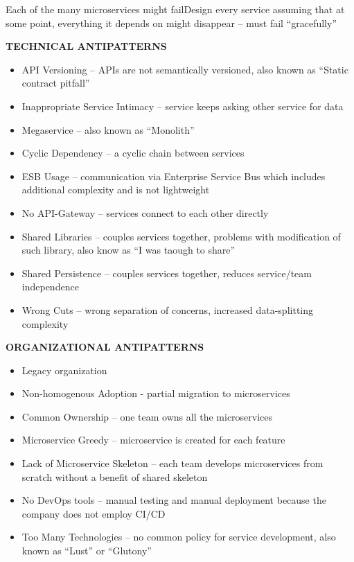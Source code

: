 Each of the many microservices might failDesign every service assuming that at some point, everything it depends on might disappear – must  fail “gracefully”

\textbf{TECHNICAL ANTIPATTERNS}

\begin{itemize}
    \item API Versioning – APIs are not semantically versioned, also known as “Static contract pitfall”
    \item Inappropriate Service Intimacy – service keeps asking other service for data
    \item Megaservice – also known as “Monolith”
    \item Cyclic Dependency – a cyclic chain between services
    \item ESB Usage – communication via Enterprise Service Bus which includes additional complexity and is not lightweight
    \item No API-Gateway – services connect to each other directly
    \item Shared Libraries – couples services together, problems with modification of such library, also know as “I was taough to share”
    \item Shared Persistence – couples services together, reduces service/team independence
    \item Wrong Cuts – wrong separation of concerns, increased data-splitting complexity
\end{itemize}

\textbf{ORGANIZATIONAL ANTIPATTERNS}

\begin{itemize}
    \item Legacy organization
    \item Non-homogenous Adoption - partial migration to microservices
    \item Common Ownership – one team owns all the microservices
    \item Microservice Greedy – microservice is created for each feature
    \item Lack of Microservice Skeleton – each team develops microservices from scratch without a benefit of shared skeleton
    \item No DevOps tools – manual testing and manual deployment because the company does not employ CI/CD
    \item Too Many Technologies – no common policy for service development, also known as “Lust” or “Glutony”
\end{itemize}

